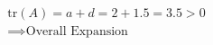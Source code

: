 \documentclass[preview]{standalone}
\begin{document}
\begin{align*}
\text{tr}(A) = a+d = 2+1.5 = 3.5 > 0 \\ \implies \text{Overall Expansion}
\end{align*}
\end{document}
